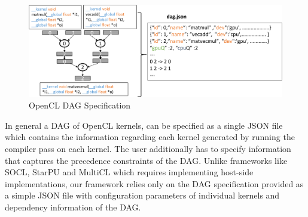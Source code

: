     \begin{figure}[ht]
		\centering
		\includegraphics[scale=0.5]{Pictures/DAGJson.pdf}
		\caption{\small OpenCL DAG Specification\label{fig:OpenCLDAG}}
	\end{figure}
	\par \noindent In general a DAG of OpenCL kernels, can be specified as a single JSON file which contains the information regarding each kernel generated by running the compiler pass on each kernel. The user additionally has to specify information that captures the precedence constraints of the DAG. Unlike frameworks like SOCL, StarPU and MultiCL which requires implementing host-side implementations, our framework relies only on the DAG specification provided as a simple JSON file with configuration parameters of individual kernels and dependency information of the DAG.  
